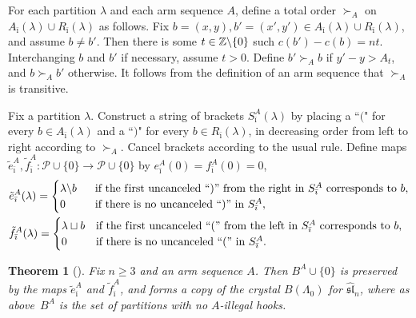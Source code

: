 \documentclass[11pt]{article}
\newtheorem{Theorem}{Theorem}[section]
\theoremstyle{definition}
\newcommand{\bz}{\Bbb{Z}}
\newcommand{\asl}{\widehat{\mathfrak{{sl}}}}
\begin{document}
For each partition $\lambda$ and each arm sequence $A$, def\/ine a total order $\succ_A$ on $ A_{\bar \imath}(\lambda) \cup R_{\bar \imath}(\lambda)$ as follows. Fix $b=(x,y),b'=(x',y') \in A_{\bar \imath}(\lambda) \cup R_{\bar \imath}(\lambda)$, and assume $b \neq b'$. Then there is some $t \in \bz \backslash \{ 0 \}$ such $c(b')-c(b)=nt$. Interchanging $b$ and $b'$ if necessary, assume $t > 0$. Def\/ine $b' \succ_A b$ if $y'-y > A_t$, and $b \succ_A b'$ otherwise.
It follows from the def\/inition of an arm sequence that $\succ_A$ is transitive.

Fix a partition $\lambda$. Construct a string of brackets $S^A_{\bar \imath}(\lambda)$ by placing a ``$($" for every $b \in A_{\bar \imath}(\lambda)$ and a ``$)$" for every $b \in R_{\bar \imath}(\lambda)$, in decreasing order from left to right according to $\succ_A$. Cancel brackets according to the usual rule. Def\/ine maps $\tilde e^A_{\bar \imath}, \tilde f^A_{\bar \imath}: \mathcal{P} \cup \{ 0 \} \rightarrow \mathcal{P} \cup \{ 0 \}$ by $e^A_{\bar \imath}(0)=f^A_{\bar \imath}(0)=0$,
\begin{gather} \label{Hcryst}
\begin{aligned}
& \tilde e_{\bar \imath}^A(\lambda) =
\begin{cases}
\lambda \backslash b~~ & \text{if the f\/irst uncanceled ``$)$'' from the right in $S^A_{\bar \imath}$ corresponds to $b$}, \\
0 & \text{if there is no uncanceled ``$)$'' in $S^A_{\bar \imath}$},
\end{cases} \\
& \tilde f_{\bar \imath}^A(\lambda)=
\begin{cases}
\lambda \sqcup b & \text{if the f\/irst uncanceled ``$($'' from the left in $S^A_{\bar \imath}$ corresponds to $b$}, \\
0 & \text{if there is no uncanceled ``$($'' in $S^A_{\bar \imath}$}.
\end{cases}
\end{aligned}
\end{gather}


\begin{Theorem}[] \label{Fayers-th} Fix $n \geq 3$ and an arm sequence $A$. Then $B^A \cup \{ 0 \}$ is preserved by the maps $\tilde e_{\bar \imath}^A$ and $\tilde f_{\bar \imath}^A$, and forms a copy of the crystal $B(\Lambda_0)$ for $\asl_n$, where as above~$B^A$ is the set of partitions with no $A$-illegal hooks.
\end{Theorem}
\end{document}
